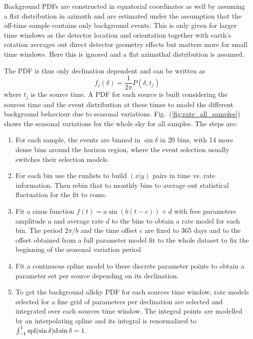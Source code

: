 Background PDFs are constructed in equatorial coordinates as well by assuming a flat distribution in azimuth and are estimated under the assumption that the off-time sample contains only background events.
This is only given for larger time windows as the detector location and orientation together with earth's rotation averages out direct detector geometry effects but matters more for small time windows.
Here this is ignored and a flat azimuthal distribution is assumed.

The PDF is thus only declination dependent and can be written as
\begin{equation}
  f_j(\delta) = \frac{1}{2\pi}P(\delta, t_j)
\end{equation}
where $t_j$ is the source time.
A PDF for each source is built considering the sources time and the event distribution at these times to model the different background behaviour due to seasonal variations.
Fig.~(\ref{fig:rate_all_samples}) shows the seasonal variations for the whole sky for all samples.
The steps are:
\begin{enumerate}
  \item For each sample, the events are binned in $\sin\delta$ in 20 bins, with 14 more dense bins around the horizon region, where the event selection usually switches their selection models.
  \item For each bin use the runlists to build $(x|y)$ pairs in time vs. rate information.
  Then rebin that to monthly bins to average out statistical fluctuation for the fit to come.
  \item Fit a sinus function $f(t) = a \sin(b(t-c)) + d$ with free parameters amplitude $a$ and average rate $d$ to the bins to obtain a rate model for each bin.
  The period $2\pi/b$ and the time offset $c$ are fixed to 365 days and to the offset obtained from a full parameter model fit to the whole dataset to fix the beginning of the seasonal variation period
  \item Fit a continuous spline model to these discrete parameter points to obtain a parameter set per source depending on its declination.
  \item To get the background allsky PDF for each sources time window, rate models selected for a fine grid of parameters per declination are selected and integrated over each sources time window.
  The integral points are modelled by an interpolating spline and its integral is renormalized to $\int_{-1}^{1} \mathrm{spl}(\sin\delta) \mathrm{d}\sin\delta = 1$.
\end{enumerate}

